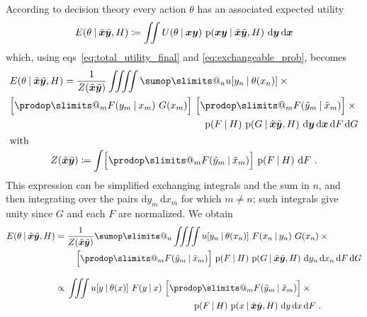 \documentclass[\ifafour a4paper,12pt,\else a5paper,10pt,\fi%
onecolumn,oneside,article,%
british%
]{memoir}
\makeatletter
\theoremstyle{remark}
\theoremstyle{innote}
\def\sum{\DOTSI\sumop\slimits@}
\def\prod{\DOTSI\prodop\slimits@}
\newcommand*{\di}{\mathrm{d}}%
\newcommand*{\defd}{\coloneqq}
\newcommand*{\p}{\mathrm{p}}%
\renewcommand*{\|}[1][]{\nonscript\:#1\vert\nonscript\:\mathopen{}}
\newcommand*{\eqns}{eqs}%
\newcommand*{\xx}[1]{x_{#1}}
\newcommand*{\yy}[1]{y_{#1}}
\newcommand*{\bx}{\bm{x}}
\newcommand*{\by}{\bm{y}}
\newcommand*{\bz}{\bm{xy}}
\newcommand*{\xxx}[1]{\tilde{x}_{#1}}
\newcommand*{\yyy}[1]{\tilde{y}_{#1}}
\newcommand*{\bzz}{\tilde{\bm{x}}\tilde{\bm{y}}}
\makeatother
\begin{document}
According to decision theory every action $\theta$ has an associated
expected utility
\begin{equation}
  \label{eq:exp_utility_theta}
  E(\theta \| \bzz, H) 
\defd \iint U(\theta \| \bz) \ \p(\bz \| \bzz, H)\ \di\by\,\di\bx
\end{equation}
which, using \eqns~\eqref{eq:total_utility_final} and
\eqref{eq:exchangeable_prob}, becomes
\begin{subequations}    \label{eq:exp_utility_replace}
  \begin{gather}
\begin{multlined}[b][0.85\linewidth]
    E(\theta \| \bzz, H) =
      \frac{1}{Z(\bzz)}\iiiint \sum_{n} u[\yy{n} \| \theta(\xx{n})]\times{}\\ 
      \shoveright{\Bigl[\prod_{m} F(\yy{m}\|\xx{m})\ G(\xx{m})\Bigr]\
      \Bigl[\prod_{m} F(\yyy{m}\|\xxx{m})\Bigr]\times{}}\\
      \p(F \| H)\
      \p(G \| \bzz, H)\ 
      \di\by\,\di\bx\,\di F\,\di G
    \end{multlined}
    \\\shortintertext{with}
    Z(\bzz) \defd
    \int \Bigl[\prod_{m} F(\yyy{m}\|\xxx{m})\Bigr]\ \p(F \| H)\ \di F \ .
  \end{gather}
\end{subequations}
This expression can be simplified exchanging integrals and the sum in $n$,
and then integrating over the pairs $\di\yy{m}\,\di\xx{m}$ for which
$m \ne n$; such integrals give unity since $G$ and each $F$ are normalized.
We obtain
\begin{equation}
  \label{eq:exp_utility_simple}
  \begin{split}
    E(\theta \| \bzz, H) 
    &=
    \!\begin{multlined}[t][0.65\linewidth]
      \frac{1}{Z(\bzz)}\sum_{n} \iiiint u[\yy{n} \| \theta(\xx{n})] \
      F(\xx{n}\|\yy{n})\ G(\xx{n}) \times{}\\
      \Bigl[\prod_{m} F(\yyy{m}\|\xxx{m})\Bigr]\ 
      \p(F \| H)\ \p(G \| \bzz, H)\
      \di\yy{n}\,\di\xx{n}\,\di F\,\di G
\end{multlined}
\\[3\jot]&\propto
    \!\begin{multlined}[t][0.65\linewidth]
      \iiint u[y \| \theta(x)] \
      F(y\|x)\ 
      \Bigl[\prod_{m} F(\yyy{m}\|\xxx{m})\Bigr]\times{}\\
      \p(F \| H)\ \p(x \| \bzz, H)\
      \di y\,\di x\,\di F
       \ .
\end{multlined}
  \end{split}
\end{equation}
\end{document}
